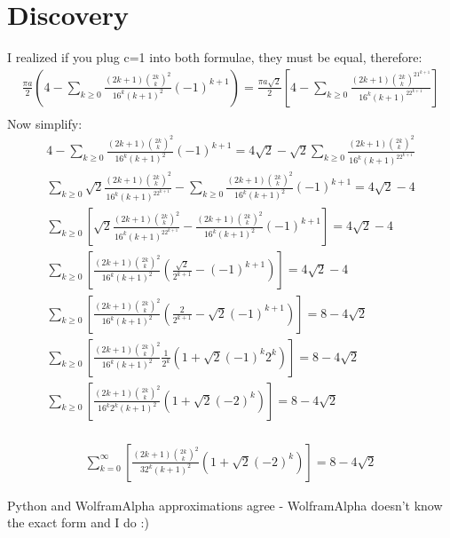 \documentclass{article}
\begin{document}
\section{Discovery}
I realized if you plug c=1 into both formulae, they must be equal, therefore:
\begin{equation*}
\begin{split}
	\frac{\pi a}{2}\left(4-\sum_{k\geq 0}\frac{(2k+1){{2k}\choose{k}}^2}{16^k(k+1)^2}(-1)^{k+1}\right)
	= \frac{\pi a\sqrt{2}}{2} \left[4 - \sum_{k\geq 0}\frac{(2k+1){{2k}\choose k}^21^{k+1}}{16^k(k+1)^22^{k+1}}\right]\\
\end{split}
\end{equation*}
Now simplify:
\begin{equation*}
\begin{split}
	4-\sum_{k\geq 0}\frac{(2k+1){{2k}\choose{k}}^2}{16^k(k+1)^2}(-1)^{k+1}
	= 4\sqrt2 - \sqrt2\sum_{k\geq 0}\frac{(2k+1){{2k}\choose k}^2}{16^k(k+1)^22^{k+1}}\\
	\sum_{k\geq 0}\sqrt2\frac{(2k+1){{2k}\choose k}^2}{16^k(k+1)^22^{k+1}}
	-\sum_{k\geq 0}\frac{(2k+1){{2k}\choose{k}}^2}{16^k(k+1)^2}(-1)^{k+1}
	= 4\sqrt2 - 4\\
	\sum_{k\geq 0}\left[\sqrt2\frac{(2k+1){{2k}\choose k}^2}{16^k(k+1)^22^{k+1}}
	- \frac{(2k+1){{2k}\choose{k}}^2}{16^k(k+1)^2}(-1)^{k+1}\right]
	= 4\sqrt2 - 4\\
	\sum_{k\geq 0}\left[\frac{(2k+1){{2k}\choose k}^2}{16^k(k+1)^2}\left(\frac{\sqrt2}{2^{k+1}}
	- (-1)^{k+1}\right)\right] = 4\sqrt2 - 4\\
	\sum_{k\geq 0}\left[\frac{(2k+1){{2k}\choose k}^2}{16^k(k+1)^2}\left(\frac{2}{2^{k+1}}
	- \sqrt2(-1)^{k+1}\right)\right] = 8 - 4\sqrt2\\
	\sum_{k\geq 0}\left[\frac{(2k+1){{2k}\choose k}^2}{16^k(k+1)^2}\frac{1}{2^k}\left(1
	+ \sqrt2(-1)^{k}2^k\right)\right] = 8 - 4\sqrt2\\
	\sum_{k\geq 0}\left[\frac{(2k+1){{2k}\choose k}^2}{16^k2^k(k+1)^2}\left(1
	+ \sqrt2(-2)^k\right)\right] = 8 - 4\sqrt2\\
\end{split}
\end{equation*}

\begin{tcolorbox}
\begin{equation*}
\begin{split}
	\sum_{k=0}^{\infty}\left[\frac{(2k+1){{2k}\choose{k}}^2}{32^k(k+1)^2}\left(1
	+ \sqrt2(-2)^{k}\right)\right]
	= 8 - 4\sqrt2
\end{split}
\end{equation*}
\end{tcolorbox}
Python and WolframAlpha approximations agree - WolframAlpha doesn't know the exact form and I do :)
\end{document}
